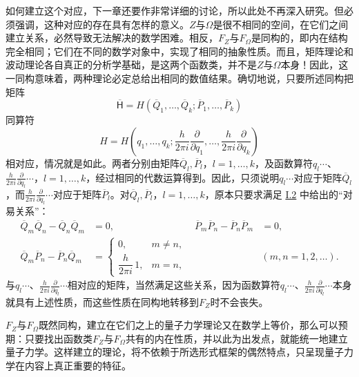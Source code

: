 \documentclass[fontsize=13pt,twoside,openany,headings=normal,parskip=false,bookmarkpackage=false,DIV=calc]{scrbook}
\begin{document}
如何建立这个对应，下一章还要作非常详细的讨论，所以此处不再深入研究。但必须强调，这种对应的存在具有怎样的意义。$Z$与$\Omega$是很不相同的空间，在它们之间建立关系，必然导致无法解决的数学困难。相反，$F_Z$与$F_\Omega$是同构的，即内在结构完全相同；它们在不同的数学对象中，实现了相同的抽象性质。而且，矩阵理论和波动理论各自真正的分析学基础，是这两个函数类，并不是$Z$与$\Omega$本身！因此，这一同构意味着，两种理论必定总给出相同的数值结果。确切地说，只要所述同构把矩阵
\[
 \overline{\mathsf{H}}=H(\overline Q_1,\ldots,\overline Q_k;\overline P_1,\ldots,\overline P_k)
\]
同算符
\[
 H=H\left(q_1,\ldots,q_k;\frac{h}{2\pi i}\frac{\partial}{\partial q_1},
 \ldots,\frac{h}{2\pi i}\frac{\partial}{\partial q_k}\right)
\]
相对应，情况就是如此。两者分别由矩阵$\overline Q_l,\allowbreak \overline P_l$，$l=1,\allowbreak \ldots,\allowbreak k$，及函数算符$q_l\cdots$、$\frac{h}{2\pi i}\frac{\partial}{\partial q_l}\cdots$，$l=1,\allowbreak \ldots,\allowbreak k$，经过相同的代数运算得到。因此，只须说明$q_l\cdots$对应于矩阵$\overline Q_l$，而$\frac{h}{2\pi i}\frac{\partial}{\partial q_l}\cdots$对应于矩阵$\overline P_l$。对$\overline Q_l,\allowbreak \overline P_l$，$l=1,\allowbreak \ldots,\allowbreak k$，原本只要求满足 \hyperref[sec:I.2]{I.2} 中给出的“对易关系”：
\begin{align*}
 \overline Q_m\overline Q_n-\overline Q_n\overline Q_m&=0,
 &\overline P_m\overline P_n-\overline P_n\overline P_m&=0,\\
 \overline Q_m\overline P_n-\overline P_n\overline Q_m
 &=\begin{cases}0,&m\ne n,\\\dfrac{h}{2\pi i}\,1,&m=n,\end{cases}
 &&(m,n=1,2,\ldots).
\end{align*}
与$q_l\cdots$、$\frac{h}{2\pi i}\frac{\partial}{\partial q_l}\cdots$相对应的矩阵，当然满足这些关系，因为函数算符$q_l\cdots$、$\frac{h}{2\pi i}\frac{\partial}{\partial q_l}\cdots$\hypertarget{origpage-18}{}\label{origpage-18}本身就具有上述性质，而这些性质在同构地转移到$F_Z$时不会丧失。

$F_Z$与$F_\Omega$既然同构，建立在它们之上的量子力学理论又在数学上等价，那么可以预期：只要找出函数类$F_Z$与$F_\Omega$共有的内在性质，并以此为出发点，就能统一地建立量子力学。这样建立的理论，将不依赖于所选形式框架的偶然特点，只呈现量子力学在内容上真正重要的特征。
\end{document}
